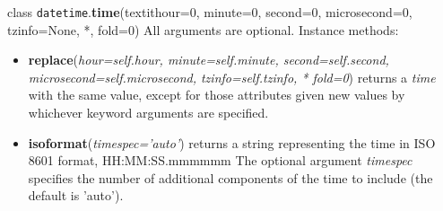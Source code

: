 \begin{enumerate}
class \texttt{datetime}.\textbf{time}(textit{hour=0, minute=0, second=0, microsecond=0, tzinfo=None, *, fold=0}) All arguments are optional.
Instance methods:
\begin{itemize}
\item \textbf{replace}(\textit{hour=self.hour, minute=self.minute, second=self.second, microsecond=self.microsecond, tzinfo=self.tzinfo, * fold=0}) returns a \textit{time} with the same value, except for those attributes given new values by whichever keyword arguments are specified.
\item \textbf{isoformat}(\textit{timespec='auto'}) returns a string representing the time in ISO 8601 format, HH:MM:SS.mmmmmm The optional argument \textit{timespec} specifies the number of additional components of the time to include (the default is 'auto').
\end{itemize}
\end{enumerate}